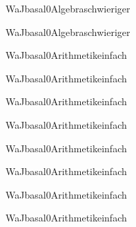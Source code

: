 \documentclass[12pt]{article}
\begin{document}
    \begin{Add}{WaJ}{basal0}{Algebra}{schwieriger}
    \solution{ }
    \end{Add}
    \begin{Add}{WaJ}{basal0}{Algebra}{schwieriger}
    \end{Add}
    

    \begin{Add}{WaJ}{basal0}{Arithmetik}{einfach}
    \solution{ }
    \end{Add}
    \begin{Add}{WaJ}{basal0}{Arithmetik}{einfach}
    \end{Add}
    

    \begin{Add}{WaJ}{basal0}{Arithmetik}{einfach}
    \solution{ }
    \end{Add}
    \begin{Add}{WaJ}{basal0}{Arithmetik}{einfach}
    \end{Add}
    

    \begin{Add}{WaJ}{basal0}{Arithmetik}{einfach}
    \solution{ }
    \end{Add}
    \begin{Add}{WaJ}{basal0}{Arithmetik}{einfach}
    \end{Add}
    

    \begin{Add}{WaJ}{basal0}{Arithmetik}{einfach}
    \solution{ }
    \end{Add}
    \begin{Add}{WaJ}{basal0}{Arithmetik}{einfach}
    \end{Add}
    
\end{document}
